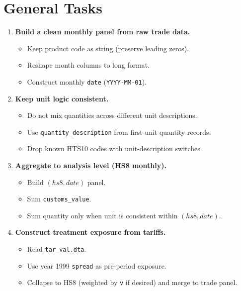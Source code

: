 \documentclass[11pt]{article}
\begin{document}
\section{General Tasks}
\begin{enumerate}[leftmargin=*]
  \item \textbf{Build a clean monthly panel from raw trade data.}
        \begin{itemize}[leftmargin=*]
          \item Keep product code as string (preserve leading zeros).
          \item Reshape month columns to long format.
          \item Construct monthly \texttt{date} (\texttt{YYYY-MM-01}).
        \end{itemize}

  \item \textbf{Keep unit logic consistent.}
        \begin{itemize}[leftmargin=*]
          \item Do not mix quantities across different unit descriptions.
          \item Use \texttt{quantity\_description} from first-unit quantity records.
          \item Drop known HTS10 codes with unit-description switches.
        \end{itemize}

  \item \textbf{Aggregate to analysis level (HS8 monthly).}
        \begin{itemize}[leftmargin=*]
          \item Build \((hs8, date)\) panel.
          \item Sum \texttt{customs\_value}.
          \item Sum quantity only when unit is consistent within \((hs8, date)\).
        \end{itemize}

  \item \textbf{Construct treatment exposure from tariffs.}
        \begin{itemize}[leftmargin=*]
          \item Read \texttt{tar\_val.dta}.
          \item Use year 1999 \texttt{spread} as pre-period exposure.
          \item Collapse to HS8 (weighted by \texttt{v} if desired) and merge to trade panel.
        \end{itemize}


\end{enumerate}
\end{document}
